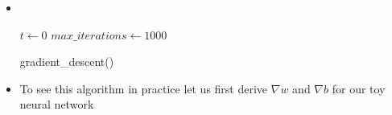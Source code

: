 \begin{frame}
	\begin{overlayarea}{\textwidth}{\textheight}
		\begin{itemize}\justifying
			\item <1-> \\
			      \onslide<2-> {
				      \begin{algorithm}[H]
					      \SetAlgoLined
					      $t \leftarrow 0$\;
					      $max\_iterations\leftarrow 1000$\;
					      \caption{gradient\_descent()}
				      \end{algorithm}
			      }
			\item <3-> To see this algorithm in practice let us first derive $\nabla w$ and $\nabla b$ for our toy neural network
		\end{itemize}
	\end{overlayarea}
\end{frame}

